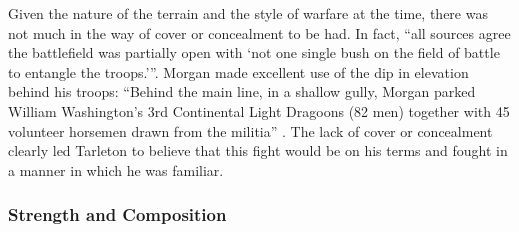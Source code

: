 Given the nature of the terrain and the style of warfare at the time, there was
not much in the way of cover or concealment to be had.  In fact, ``all sources
agree the battlefield was partially open with `not one single bush on the field
of battle to entangle the troops.'''\cite[66]{babits_devil_2001}.
%
Morgan made excellent use of
the dip in elevation behind his troops: ``Behind the main line, in a shallow
gully, Morgan parked William Washington's 3rd Continental Light Dragoons (82
men) together with 45 volunteer horsemen drawn from the militia''
\cite[327]{stephenson_patriot_2007}.  The lack of cover or concealment clearly
led Tarleton to believe that this fight would be on his terms and fought in a
manner in which he was familiar.  


%
%
%
%
%
%
%
%
%
%
%

\subsubsection{Strength and Composition}


